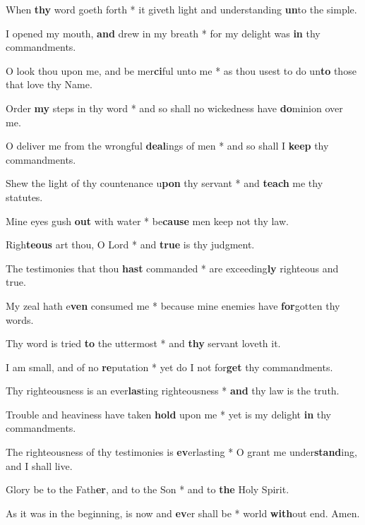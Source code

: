 \begin{multicols}{2}
	When \textbf{thy} word goeth forth * it giveth light and understanding \textbf{un}to the simple.
	
	I opened my mouth, \textbf{and} drew in my breath * for my delight was \textbf{in} thy commandments.
	
	O look thou upon me, and be mer\textbf{ci}ful unto me * as thou usest to do un\textbf{to} those that love thy Name.
	
	Order \textbf{my} steps in thy word * and so shall no wickedness have \textbf{do}minion over me.
	
	O deliver me from the wrongful \textbf{deal}ings of men * and so shall I \textbf{keep} thy commandments.
	
	Shew the light of thy countenance u\textbf{pon} thy servant * and \textbf{teach} me thy statutes.
	
	Mine eyes gush \textbf{out} with water * be\textbf{cause} men keep not thy law.
	
	Righ\textbf{teous} art thou, O Lord * and \textbf{true} is thy judgment.
	
	The testimonies that thou \textbf{hast} commanded * are exceeding\textbf{ly} righteous and true.
	
	My zeal hath e\textbf{ven} consumed me * because mine enemies have \textbf{for}gotten thy words.
	
	Thy word is tried \textbf{to} the uttermost * and \textbf{thy} servant loveth it.
	
	I am small, and of no \textbf{re}putation * yet do I not for\textbf{get} thy commandments.
	
	Thy righteousness is an ever\textbf{las}ting righteousness * \textbf{and} thy law is the truth.
	
	Trouble and heaviness have taken \textbf{hold} upon me * yet is my delight \textbf{in} thy commandments.
	
	The righteousness of thy testimonies is \textbf{ev}erlasting * O grant me under\textbf{stand}ing, and I shall live.
	
	Glory be to the Fath\textbf{er}, and to the Son * and to \textbf{the} Holy Spirit.
	
	As it was in the beginning, is now and \textbf{ev}er shall be * world \textbf{with}out end. Amen.
\end{multicols}